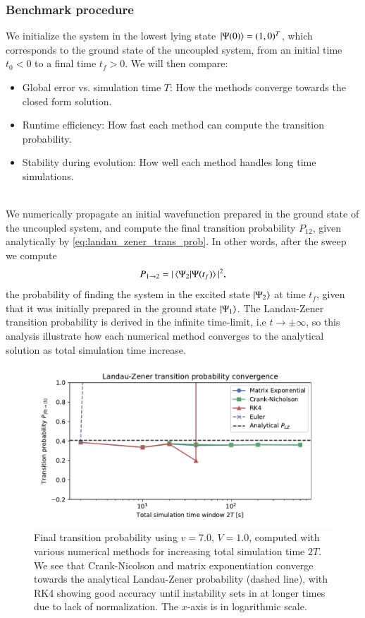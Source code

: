 \documentclass{subfiles}
\begin{document}
\subsubsection*{Benchmark procedure}
We initialize the system in the lowest lying state $\ket{\Psi(0)} = (1, 0)^T$, which corresponds to the ground state of the uncoupled system, from an initial time $t_0<0$ to a final time $t_f>0$. We will then compare:
\begin{itemize}
    \item Global error vs. simulation time $T$: How the methods converge towards the closed form solution.
    \item Runtime efficiency: How fast each method can compute the transition probability.
    \item Stability during evolution: How well each method handles long time simulations. 
\end{itemize}
\\ 
We numerically propagate an initial wavefunction prepared in the ground state of the uncoupled system, and compute the final transition probability $P_{12}$, given analytically by \eqref{eq:landau_zener_trans_prob}. In other words, after the sweep we compute 
\begin{align*}
    P_{1\to2} = |\braket{\Psi_2|\Psi(t_f)}|^2,
\end{align*}
the probability of finding the system in the excited state $\ket{\Psi_2}$ at time $t_f$, given that it was initially prepared in the ground state $\ket{\Psi_1}$. The Landau-Zener transition probability is derived in the infinite time-limit, i.e $t\rightarrow \pm \infty$, so this analysis illustrate how each numerical method converges to the analytical solution as total simulation time increase.
\begin{figure}[h!]
\centering
\includegraphics[width=1.0\textwidth]{figs/landau_zener_convergence_benchmark.pdf}
\caption{Final transition probability using $v=7.0$, $V=1.0$, computed with various numerical methods for increasing total simulation time $
2T$. We see that Crank-Nicolson and matrix exponentiation converge towards the analytical Landau-Zener probability (dashed line), with RK4 showing good accuracy until instability sets in at longer times due to lack of normalization. The $x$-axis is in logarithmic scale.}
\label{fig:landau_zener_convergence_benchmark}
\end{figure}
\end{document}
